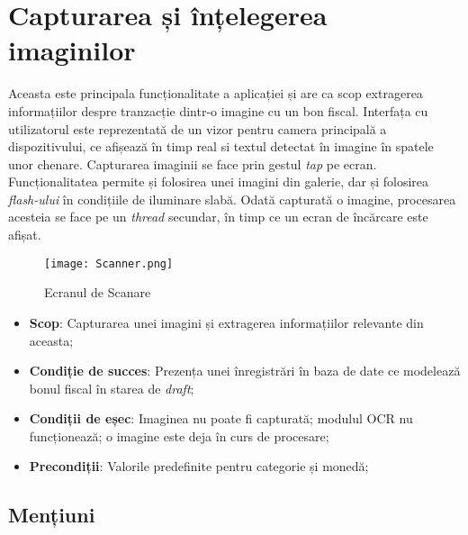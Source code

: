 \section{Capturarea și înțelegerea imaginilor}\label{understanding_spec}



Aceasta este principala funcționalitate a aplicației și are ca scop extragerea informațiilor despre tranzacție dintr-o imagine cu un bon fiscal. Interfața cu utilizatorul este reprezentată de un vizor pentru camera principală a dispozitivului, ce afișează în timp real si textul detectat în imagine în spatele unor chenare.  Capturarea imaginii se face prin gestul \emph{tap} pe ecran. Funcționalitatea permite și folosirea unei imagini din galerie, dar și folosirea \emph{flash-ului} în condițiile de iluminare slabă. Odată capturată o imagine, procesarea acesteia se face pe un \emph{thread} secundar, în timp ce un ecran de încărcare este afișat.

\begin{figure}[ht]
  \centering
  \texttt{[image: Scanner.png]}
  \caption{Ecranul de Scanare}
  \label{fig:scanner}
\end{figure}

\begin{itemize}
\item
  \textbf{Scop}: Capturarea unei imagini și extragerea informațiilor relevante din aceasta;
\item
  \textbf{Condiție de succes}: Prezența unei înregistrări în baza de date ce modelează bonul fiscal în starea de \emph{draft};
\item
  \textbf{Condiții de eșec}: Imaginea nu poate fi capturată; modulul OCR nu funcționează; o imagine este deja în curs de procesare;
\item
  \textbf{Precondiții}: Valorile predefinite pentru categorie și monedă;
\end{itemize}

\subsection*{Mențiuni}

